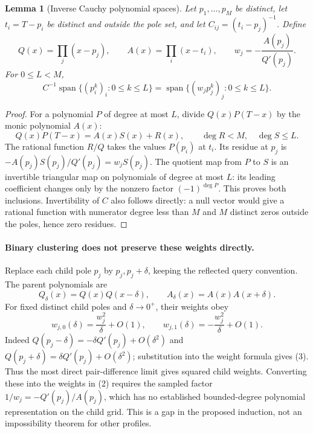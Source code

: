 \documentclass[11pt]{article}
\newtheorem{lemma}{Lemma}
\begin{document}
\begin{lemma}[Inverse Cauchy polynomial spaces]
Let $p_1,\ldots,p_M$ be distinct, let $t_i=T-p_i$ be distinct and
outside the pole set, and let $C_{ij}=(t_i-p_j)^{-1}$.
Define
\[
 Q(x)=\prod_j(x-p_j),\qquad A(x)=\prod_i(x-t_i),\qquad
 w_j=-\frac{A(p_j)}{Q'(p_j)}.
\]
For $0\leq L<M$,
\[
 C^{-1}\operatorname{span}\{(p_i^k)_i:0\leq k\leq L\}
 =\operatorname{span}\{(w_jp_j^k)_j:0\leq k\leq L\}.          \tag{2}
\]
\end{lemma}
\begin{proof}
For a polynomial $P$ of degree at most $L$, divide
$Q(x)P(T-x)$ by the monic polynomial $A(x)$:
\[
 Q(x)P(T-x)=A(x)S(x)+R(x),\qquad \deg R<M,\quad\deg S\leq L.
\]
The rational function $R/Q$ takes the values $P(p_i)$ at $t_i$.
Its residue at $p_j$ is $-A(p_j)S(p_j)/Q'(p_j)=w_jS(p_j)$.
The quotient map from $P$ to $S$ is an invertible triangular map on
polynomials of degree at most $L$: its leading coefficient changes
only by the nonzero factor $(-1)^{\deg P}$. This proves both inclusions.
Invertibility of $C$ also follows directly: a null vector would give a
rational function with numerator degree less than $M$ and $M$ distinct
zeros outside the poles, hence zero residues.
\end{proof}

\paragraph{Binary clustering does not preserve these weights directly.}
Replace each child pole $p_j$ by $p_j,p_j+\delta$, keeping the reflected
query convention. The parent polynomials are
\[
 Q_\delta(x)=Q(x)Q(x-\delta),\qquad
 A_\delta(x)=A(x)A(x+\delta).
\]
For fixed distinct child poles and $\delta\to0^+$, their weights obey
\[
 w_{j,0}(\delta)=\frac{w_j^2}{\delta}+O(1),\qquad
 w_{j,1}(\delta)=-\frac{w_j^2}{\delta}+O(1).                  \tag{3}
\]
Indeed $Q(p_j-\delta)=-\delta Q'(p_j)+O(\delta^2)$ and
$Q(p_j+\delta)=\delta Q'(p_j)+O(\delta^2)$; substitution into the
weight formula gives (3).
Thus the most direct pair-difference limit gives squared child weights.
Converting these into the weights in (2) requires the sampled factor
$1/w_j=-Q'(p_j)/A(p_j)$, which has no established bounded-degree
polynomial representation on the child grid. This is a gap in the
proposed induction, not an impossibility theorem for other profiles.
\end{document}
